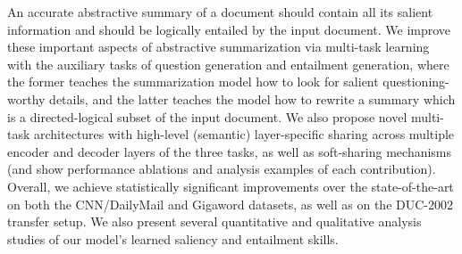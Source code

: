 An accurate abstractive summary of a document should contain all its salient information and should be logically entailed by the input document. We improve these important aspects of abstractive summarization via multi-task learning with the auxiliary tasks of question generation and entailment generation, where the former teaches the summarization model how to look for salient questioning-worthy details, and the latter teaches the model how to rewrite a summary which is a directed-logical subset of the input document. We also propose novel multi-task architectures with high-level (semantic) layer-specific sharing across multiple encoder and decoder layers of the three tasks, as well as soft-sharing mechanisms (and show performance ablations and analysis examples of each contribution). Overall, we achieve statistically significant improvements over the state-of-the-art on both the CNN/DailyMail and Gigaword datasets, as well as on the DUC-2002 transfer setup. We also present several quantitative and qualitative analysis studies of our model's learned saliency and entailment skills.
